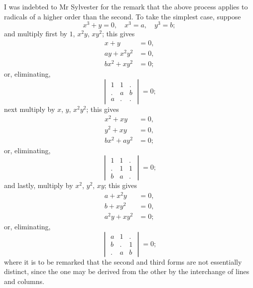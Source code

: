 \documentclass[11pt]{article}
\begin{document}
I was indebted to Mr Sylvester for the remark that the above process applies to radicals of a higher order than the second. To take the simplest case, suppose
\[
x^3 + y = 0, \quad x^3 = a, \quad y^3 = b;
\]
and multiply first by $1$, $x^2y$, $xy^2$; this gives
\begin{align*}
x + y &= 0,\\
ay + x^2y^2 &= 0,\\
bx^2 + xy^2 &= 0;
\end{align*}
or, eliminating,
\[
\begin{vmatrix}
1 & 1 & . \\
. & a & b \\
a & . & .
\end{vmatrix} = 0;
\]
next multiply by $x$, $y$, $x^2y^2$; this gives
\begin{align*}
x^2 + xy &= 0,\\
y^2 + xy &= 0,\\
bx^2 + ay^2 &= 0;
\end{align*}
or, eliminating,
\[
\begin{vmatrix}
1 & 1 & . \\
. & 1 & 1 \\
b & a & .
\end{vmatrix} = 0;
\]
and lastly, multiply by $x^2$, $y^2$, $xy$; this gives
\begin{align*}
a + x^2y &= 0,\\
b + xy^2 &= 0,\\
a^2y + xy^2 &= 0;
\end{align*}
or, eliminating,
\[
\begin{vmatrix}
a & 1 & . \\
b & . & 1 \\
. & a & b
\end{vmatrix} = 0;
\]
where it is to be remarked that the second and third forms are not essentially distinct, since the one may be derived from the other by the interchange of lines and columns.

\newpage
\setcounter{page}{43}
\end{document}
